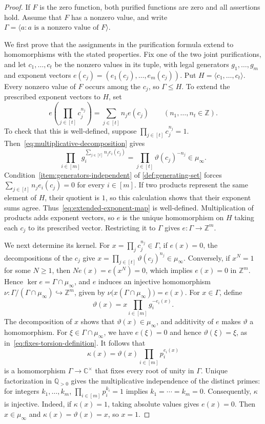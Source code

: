 \documentclass[11pt,letterpaper,onecolumn]{article}
\theoremstyle{plain}
\theoremstyle{definition}
\theoremstyle{remark}
\begin{document}
\begin{proof}
If $F$ is the zero function, both purified functions are zero and all
assertions hold.  Assume that $F$ has a nonzero value, and write
$\Gamma=\langle a:a\text{ is a nonzero value of }F\rangle$.

We first prove that the assignments in the purification formula extend
to homomorphisms with the stated properties.
Fix one of the two joint purifications, and let $c_1,\ldots,c_t$ be the
nonzero values in its tuple,
with legal generators $g_1,\ldots,g_m$ and exponent vectors
$e(c_j)=(e_1(c_j),\ldots,e_m(c_j))$.
Put $H=\langle c_1,\ldots,c_t\rangle$.  Every nonzero value of $F$ occurs
among the $c_j$, so $\Gamma\le H$.
To extend the prescribed exponent vectors to $H$, set
\begin{equation}
  e\left(\prod_{j\in[t]} c_j^{n_j}\right)
  =\sum_{j\in[t]} n_j e(c_j)
  \qquad(n_1,\ldots,n_t\in\mathbb Z).
  \label{eq:extended-exponent-map}
\end{equation}
To check that this is well-defined, suppose
$\prod_{j\in[t]}c_j^{n_j}=1$.
Then~\eqref{eq:multiplicative-decomposition} gives
\begin{equation*}
  \prod_{i\in[m]}
       g_i^{\sum_{j\in[t]} n_j e_i(c_j)}
  =\prod_{j\in[t]}\vartheta(c_j)^{-n_j}\in\mu_\infty.
\end{equation*}
Condition~\ref{item:generators-independent} of \cref{def:generating-set} forces
$\sum_{j\in[t]}n_j e_i(c_j)=0$ for every $i\in[m]$.
If two products represent the same element of $H$, their quotient is
$1$, so this calculation shows that their exponent sums agree.
Thus~\eqref{eq:extended-exponent-map} is well-defined.
Multiplication of products adds exponent vectors, so $e$ is the unique
homomorphism on $H$ taking each $c_j$ to its prescribed vector.
Restricting it to $\Gamma$ gives $e:\Gamma\to\mathbb Z^m$.

We next determine its kernel.  For $x=\prod_j c_j^{n_j}\in\Gamma$,
if $e(x)=0$, the decompositions of the $c_j$ give
$x=\prod_{j\in[t]}\vartheta(c_j)^{n_j}\in\mu_\infty$.
Conversely, if $x^N=1$ for some $N\ge1$, then
$N e(x)=e(x^N)=0$, which implies $e(x)=0$ in $\mathbb Z^m$.
Hence $\ker e=\Gamma\cap\mu_\infty$, and $e$ induces an injective
homomorphism
$\nu:\Gamma/(\Gamma\cap\mu_\infty)\hookrightarrow\mathbb Z^m$,
given by $\nu\bigl(x(\Gamma\cap\mu_\infty)\bigr)=e(x)$.
For $x\in\Gamma$, define
\[
  \vartheta(x)=x\prod_{i\in[m]} g_i^{-e_i(x)}.
\]
The decomposition of $x$ shows that $\vartheta(x)\in\mu_\infty$, and
additivity of $e$ makes $\vartheta$ a homomorphism.
For $\xi\in\Gamma\cap\mu_\infty$, we have $e(\xi)=0$ and hence
$\vartheta(\xi)=\xi$, as in~\eqref{eq:fixes-torsion-definition}.
It follows that
\[
  \kappa(x)=\vartheta(x)\prod_{i\in[m]} p_i^{e_i(x)}
\]
is a homomorphism $\Gamma\to\mathbb C^\times$ that fixes every root of
unity in $\Gamma$.
Unique factorization in $\mathbb Q_{>0}$ gives the multiplicative
independence of the distinct primes: for integers $k_1,\ldots,k_m$,
$\prod_{i\in[m]}p_i^{k_i}=1$ implies $k_1=\cdots=k_m=0$.
Consequently, $\kappa$ is injective.  Indeed, if $\kappa(x)=1$, taking
absolute values gives $e(x)=0$.  Then $x\in\mu_\infty$ and
$\kappa(x)=\vartheta(x)=x$, so $x=1$.


\end{proof}
\end{document}
